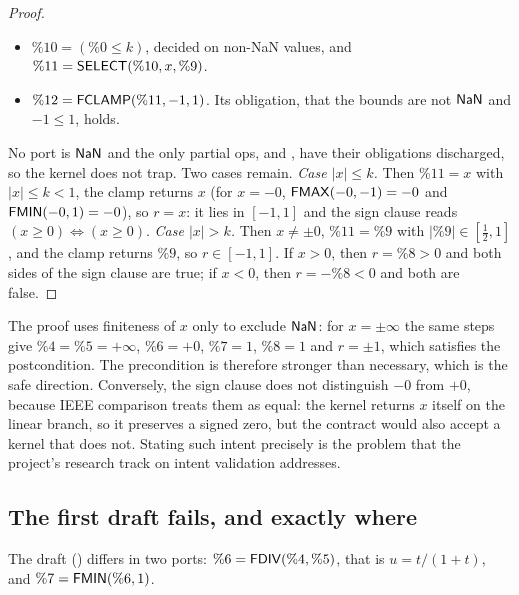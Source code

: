 \begin{proof}
\begin{itemize}
\item $\%10=(\%0\le k)$, decided on non-NaN values, and $\%11=\mbox{\textsf{SELECT}}(\%10,x,\%9)$.
\item $\%12=\mbox{\textsf{FCLAMP}}(\%11,-1,1)$. Its obligation, that the bounds are not $\mathsf{NaN}$ and
  $-1\le1$, holds.
\end{itemize}
No port is $\mathsf{NaN}$ and the only partial ops,  and , have their
obligations discharged, so the kernel does not trap. Two cases remain.
\emph{Case $|x|\le k$.} Then $\%11=x$ with $|x|\le k<1$, the clamp returns $x$ (for $x=-0$,
$\mbox{\textsf{FMAX}}(-0,-1)=-0$ and $\mbox{\textsf{FMIN}}(-0,1)=-0$), so $r=x$: it lies in $[-1,1]$ and the sign
clause reads $(x\ge0)\Leftrightarrow(x\ge0)$.
\emph{Case $|x|>k$.} Then $x\neq\pm0$, $\%11=\%9$ with $|\%9|\in[\frac12,1]$, and the clamp
returns $\%9$, so $r\in[-1,1]$. If $x>0$, then $r=\%8>0$ and both sides of the sign clause are
true; if $x<0$, then $r=-\%8<0$ and both are false.
\end{proof}

\begin{remark}\label{rem:contract}
The proof uses finiteness of $x$ only to exclude $\mathsf{NaN}$: for $x=\pm\infty$ the same steps give
$\%4=\%5=+\infty$, $\%6=+0$, $\%7=1$, $\%8=1$ and $r=\pm1$, which satisfies the postcondition. The
precondition is therefore stronger than necessary, which is the safe direction. Conversely, the
sign clause does not distinguish $-0$ from $+0$, because IEEE comparison treats them as
equal: the kernel returns $x$ itself on the linear branch, so it preserves a signed zero, but
the contract would also accept a kernel that does not. Stating such intent precisely is the
problem that the project's research track on intent validation addresses.
\end{remark}

\subsection{The first draft fails, and exactly where}

The draft () differs in two ports:
$\%6=\mbox{\textsf{FDIV}}(\%4,\%5)$, that is $u=t/(1+t)$, and $\%7=\mbox{\textsf{FMIN}}(\%6,1)$.

